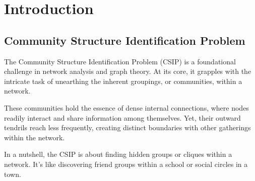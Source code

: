 \section{Introduction}
\subsection{Community Structure Identification Problem}
The Community Structure Identification Problem (CSIP) is a foundational challenge in network analysis and graph theory. At its core, it grapples with the intricate task of unearthing the inherent groupings, or communities, within a network. 

These communities hold the essence of dense internal connections, where nodes readily interact and share information among themselves. Yet, their outward tendrils reach less frequently, creating distinct boundaries with other gatherings within the network.

In a nutshell, the CSIP is about finding hidden groups or cliques within a network. It's like discovering friend groups within a school or social circles in a town. 

